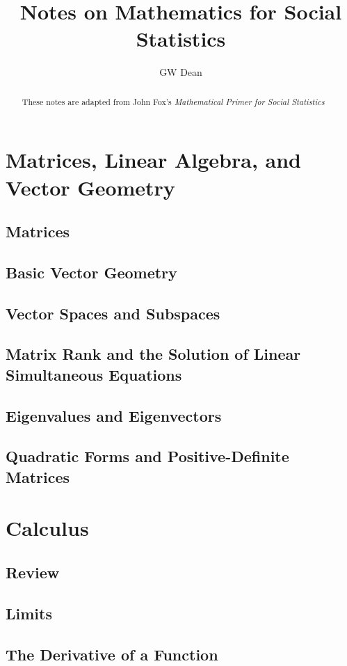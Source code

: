 \documentclass[a4paper,11pt]{article}
\author{GW Dean}
\title{Notes on Mathematics for Social Statistics}
\begin{document}
\maketitle
\tableofcontents

\begin{abstract}
These notes are adapted from John Fox's \emph{Mathematical Primer for
Social Statistics}
\end{abstract}

\section{Matrices, Linear Algebra, and Vector Geometry}
\subsection{Matrices}
\subsection{Basic Vector Geometry}
\subsection{Vector Spaces and Subspaces}
\subsection{Matrix Rank and the Solution of Linear Simultaneous Equations}
\subsection{Eigenvalues and Eigenvectors}
\subsection{Quadratic Forms and Positive-Definite Matrices}
\section{Calculus}
\subsection{Review}
\subsection{Limits}
\subsection{The Derivative of a Function}
\end{document}

